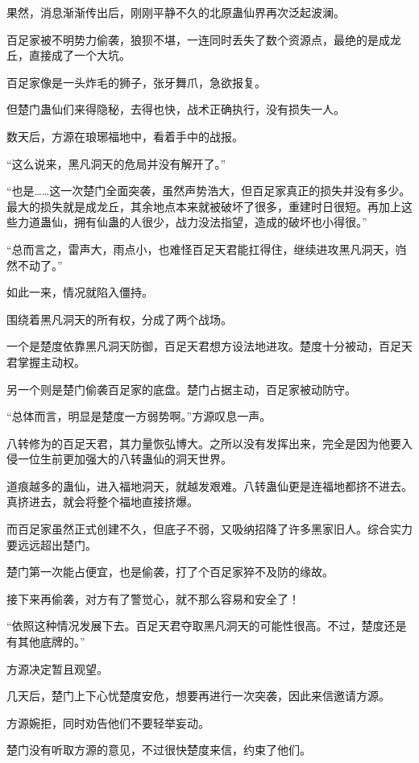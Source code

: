 \begin{this_body}
果然，消息渐渐传出后，刚刚平静不久的北原蛊仙界再次泛起波澜。

百足家被不明势力偷袭，狼狈不堪，一连同时丢失了数个资源点，最绝的是成龙丘，直接成了一个大坑。

百足家像是一头炸毛的狮子，张牙舞爪，急欲报复。

但楚门蛊仙们来得隐秘，去得也快，战术正确执行，没有损失一人。

数天后，方源在琅琊福地中，看着手中的战报。

“这么说来，黑凡洞天的危局并没有解开了。”

“也是……这一次楚门全面突袭，虽然声势浩大，但百足家真正的损失并没有多少。最大的损失就是成龙丘，其余地点本来就被破坏了很多，重建时日很短。再加上这些力道蛊仙，拥有仙蛊的人很少，战力没法指望，造成的破坏也小得很。”

“总而言之，雷声大，雨点小，也难怪百足天君能扛得住，继续进攻黑凡洞天，岿然不动了。”

如此一来，情况就陷入僵持。

围绕着黑凡洞天的所有权，分成了两个战场。

一个是楚度依靠黑凡洞天防御，百足天君想方设法地进攻。楚度十分被动，百足天君掌握主动权。

另一个则是楚门偷袭百足家的底盘。楚门占据主动，百足家被动防守。

“总体而言，明显是楚度一方弱势啊。”方源叹息一声。

八转修为的百足天君，其力量恢弘博大。之所以没有发挥出来，完全是因为他要入侵一位生前更加强大的八转蛊仙的洞天世界。

道痕越多的蛊仙，进入福地洞天，就越发艰难。八转蛊仙更是连福地都挤不进去。真挤进去，就会将整个福地直接挤爆。

而百足家虽然正式创建不久，但底子不弱，又吸纳招降了许多黑家旧人。综合实力要远远超出楚门。

楚门第一次能占便宜，也是偷袭，打了个百足家猝不及防的缘故。

接下来再偷袭，对方有了警觉心，就不那么容易和安全了！

“依照这种情况发展下去。百足天君夺取黑凡洞天的可能性很高。不过，楚度还是有其他底牌的。”

方源决定暂且观望。

几天后，楚门上下心忧楚度安危，想要再进行一次突袭，因此来信邀请方源。

方源婉拒，同时劝告他们不要轻举妄动。

楚门没有听取方源的意见，不过很快楚度来信，约束了他们。


\end{this_body}
